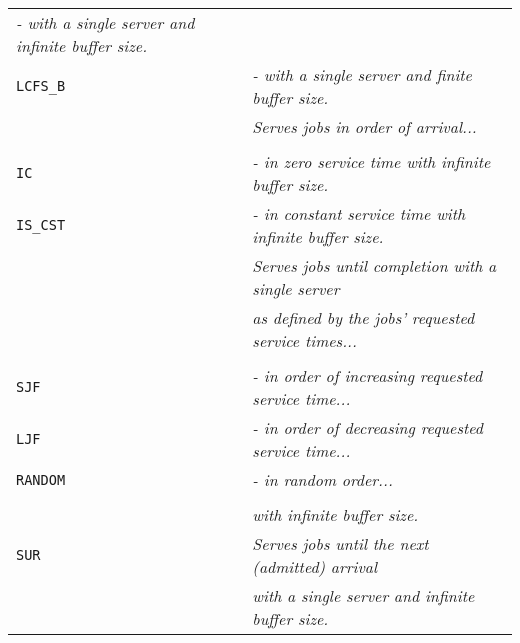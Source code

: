 \begin{table}[!htbp]
\begin{center}
\begin{tabular}{|l|l|}
              {\em - with a single server
                     and infinite buffer size.}
              \\
			\lstinline|LCFS_B|
              &
              {\em - with a single server
                     and finite buffer size.}
              \\
            \hline
              &
              {\em Serves jobs in order of arrival...}
              \\
              &
              \\
			\lstinline|IC|
              &
              {\em - in zero service time
                     with infinite buffer size.} 
              \\
			\lstinline|IS_CST|
              &
              {\em - in constant service time
                     with infinite buffer size.}
              \\
            \hline
              &
              {\em Serves jobs
                   until completion
                   with a single server}
              \\
              &
              {\em as defined by the jobs'
                   requested service times...}
              \\
              &
              \\
			\lstinline|SJF|
              &
              {\em - in order
                     of increasing requested service time...} 
              \\
			\lstinline|LJF|
              &
              {\em - in order
                     of decreasing requested service time...} 
              \\
			\lstinline|RANDOM|
              &
              {\em - in random order...}
              \\
              &
              \\
              &
              {\em with infinite buffer size.} 
              \\
            \hline
			\lstinline|SUR|
              &
              {\em Serves jobs until
                   the next (admitted) arrival} 
              \\
              &
              {\em with a single server
                   and infinite buffer size.} 
              \\
            \hline
		\end{tabular}
	\end{center}
\end{table}

